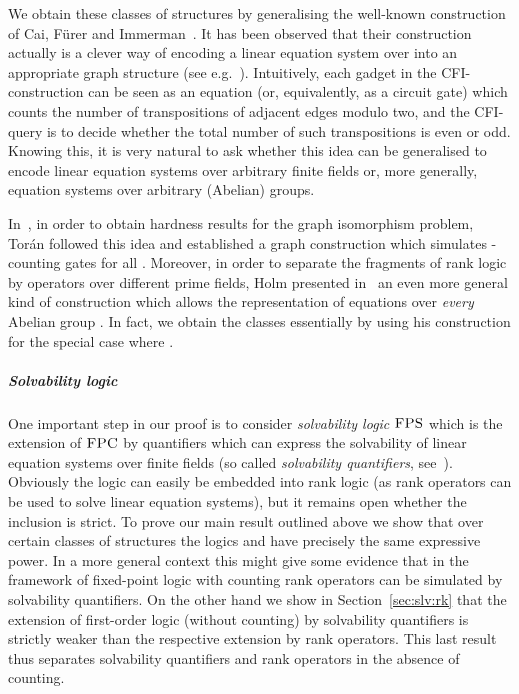 \documentclass[a4paper,UKenglish]{lipics}
\newcommand{\logic}[1]{\ensuremath{\textsc{#1}}\xspace}
\newcommand{\FPC}{\logic{FPC}}
\newcommand{\FPS}{\ensuremath{\logic{FPS}}\xspace}
\theoremstyle{plain}
\begin{document}
\smallskip
We obtain these classes of structures  by generalising the 
well-known construction of Cai, Fürer and Immerman~\cite{CFI92}.
It has been observed that their construction actually is a clever way of 
encoding a linear equation system over  into an appropriate graph 
structure (see e.g.\ \cite{AtBuDa09, DaGrHoLa09, Ho10, La11}).
Intuitively, each gadget in the CFI-construction can be seen as an 
equation (or, equivalently, as a circuit gate) which counts the number of 
transpositions of adjacent edges modulo two, and the CFI-query is to decide 
whether the total number of such transpositions is even or odd.
Knowing this, it is very natural to ask whether this idea can be generalised to 
encode linear equation systems over arbitrary finite fields or, more generally, 
equation systems over arbitrary (Abelian) groups.

In~\cite{To04}, in order to obtain hardness results for 
the graph isomorphism problem, Tor\'{a}n followed this idea and established a 
graph construction which simulates -counting gates
for all . 
Moreover, in order to separate the fragments of rank logic by operators over 
different prime fields, Holm presented in~\cite{Ho10} an even more general kind 
of construction which allows the representation of equations over \emph{every} 
Abelian group . In fact, we obtain the classes  essentially by 
using his construction for the special case where .


\subparagraph*{Solvability logic}
One important step in our proof is to consider \emph{solvability 
logic} \FPS which is the extension of \FPC by quantifiers which can express the 
solvability of linear equation systems over finite fields (so called 
\emph{solvability quantifiers}, see~\cite{DaGrHoKoPa13, Pa10}). 
Obviously the logic  can easily be embedded into rank logic (as rank 
operators can be used to solve linear equation systems), but it remains open 
whether the inclusion  is strict.
To prove our main result outlined above we show that over certain classes of 
structures the logics  and  have precisely the same expressive 
power. In a more general context this might give some evidence that in the 
framework of fixed-point logic with counting rank operators can be simulated by 
solvability quantifiers.
On the other hand we show in Section~\ref{sec:slv:rk} that the 
extension of first-order logic (without counting) by solvability quantifiers 
is strictly weaker than the respective extension by rank operators.
This last result thus separates solvability quantifiers and rank 
operators in  the absence of counting.
\end{document}
